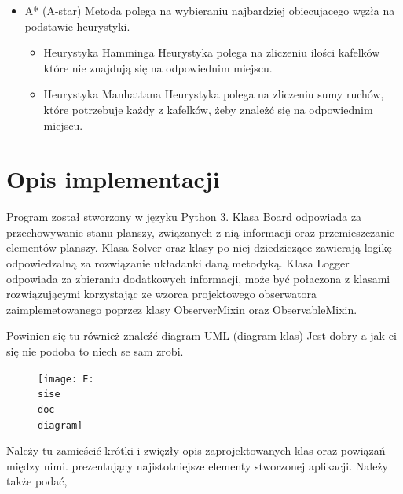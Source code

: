 \documentclass{classrep}
\begin{document}
{\begin{itemize}
            Metoda polega na przeszukiwaniu w głąb, oznacza to że zanim zbada kolejną krawedź pierwszego węzła
            dopiero gdy zbada wszystkie krawędzie kolejnego węzła
            \item A* (A-star)
                Metoda polega na wybieraniu najbardziej obiecujacego węzła na podstawie heurystyki.
                \begin{itemize}
                    \item Heurystyka Hamminga
                        Heurystyka polega na zliczeniu ilości kafelków które nie znajdują się na odpowiednim miejscu.
                    \item Heurystyka Manhattana
                        Heurystyka polega na zliczeniu sumy ruchów, które potrzebuje każdy z kafelków, żeby znależć się na odpowiednim miejscu.
                \end{itemize}
        \end{itemize}

    }

    \section{Opis implementacji}
    {\color{blue}
    Program został stworzony w języku Python 3.
    Klasa Board odpowiada za przechowywanie stanu planszy, związanych z nią informacji oraz
    przemieszczanie elementów planszy.
    Klasa Solver oraz klasy po niej dziedziczące zawierają logikę odpowiedzalną za rozwiązanie układanki daną metodyką.
    Klasa Logger odpowiada za zbieraniu dodatkowych informacji, może być połaczona z klasami rozwiązującymi
    korzystając ze wzorca projektowego obserwatora zaimplemetowanego poprzez klasy ObserverMixin oraz ObservableMixin.

    Powinien się tu również znaleźć diagram UML (diagram klas)
    Jest dobry a jak ci się nie podoba to niech se sam zrobi.
    \begin{figure}
        \centering
        \texttt{[image: E:\\sise\\doc\\diagram]}
        \caption{}
        \label{fig:}
    \end{figure}


    Należy tu zamieścić krótki i zwięzły opis zaprojektowanych klas oraz powiązań
    między nimi.
        prezentujący najistotniejsze elementy stworzonej aplikacji. Należy także podać,




    }
\end{document}
